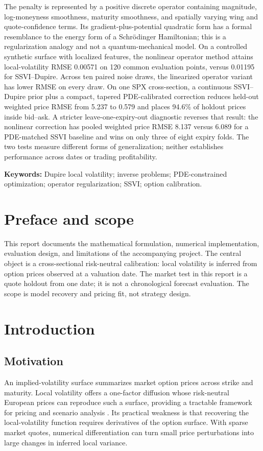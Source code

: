 \documentclass[11pt,a4paper]{article}
\begin{document}
The penalty is represented by a positive discrete operator containing magnitude, log-moneyness smoothness, maturity smoothness, and spatially varying wing and quote-confidence terms. Its gradient-plus-potential quadratic form has a formal resemblance to the energy form of a Schr\"odinger Hamiltonian; this is a regularization analogy and not a quantum-mechanical model. On a controlled synthetic surface with localized features, the nonlinear operator method attains local-volatility RMSE 0.00571 on 120 common evaluation points, versus 0.01195 for SSVI--Dupire. Across ten paired noise draws, the linearized operator variant has lower RMSE on every draw. On one SPX cross-section, a continuous SSVI--Dupire prior plus a compact, tapered PDE-calibrated correction reduces held-out weighted price RMSE from 5.237 to 0.579 and places 94.6\% of holdout prices inside bid--ask. A stricter leave-one-expiry-out diagnostic reverses that result: the nonlinear correction has pooled weighted price RMSE 8.137 versus 6.089 for a PDE-matched SSVI baseline and wins on only three of eight expiry folds. The two tests measure different forms of generalization; neither establishes performance across dates or trading profitability.

\textbf{Keywords:} Dupire local volatility; inverse problems; PDE-constrained optimization; operator regularization; SSVI; option calibration.

\section*{Preface and scope}
This report documents the mathematical formulation, numerical implementation, evaluation design, and limitations of the accompanying project. The central object is a cross-sectional risk-neutral calibration: local volatility is inferred from option prices observed at a valuation date. The market test in this report is a quote holdout from one date; it is not a chronological forecast evaluation. The scope is model recovery and pricing fit, not strategy design.

\tableofcontents
\clearpage
{}

\section{Introduction}
\subsection{Motivation}
An implied-volatility surface summarizes market option prices across strike and maturity. Local volatility offers a one-factor diffusion whose risk-neutral European prices can reproduce such a surface, providing a tractable framework for pricing and scenario analysis \cite{Dupire1994,DermanKani1994}. Its practical weakness is that recovering the local-volatility function requires derivatives of the option surface. With sparse market quotes, numerical differentiation can turn small price perturbations into large changes in inferred local variance.
\end{document}
